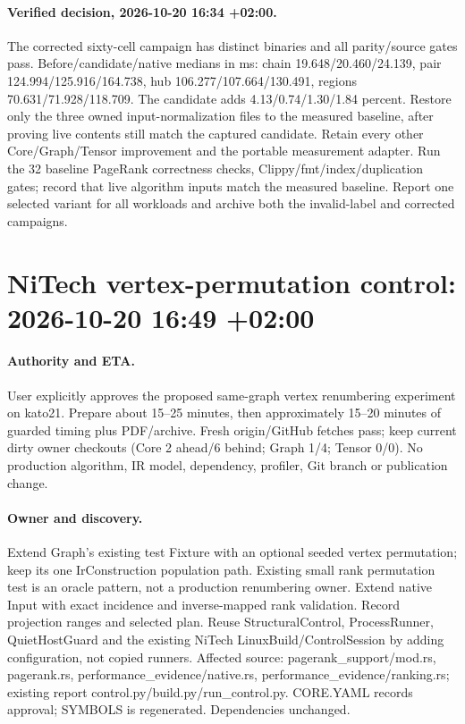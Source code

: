 \documentclass[11pt,a4paper]{article}
\begin{document}
\paragraph{Verified decision, 2026-10-20 16:34 +02:00.}
The corrected sixty-cell campaign has distinct binaries and all parity/source gates pass.
Before/candidate/native medians in ms: chain 19.648/20.460/24.139,
pair 124.994/125.916/164.738, hub 106.277/107.664/130.491,
regions 70.631/71.928/118.709. The candidate adds 4.13/0.74/1.30/1.84 percent.
Restore only the three owned input-normalization files to the measured baseline,
after proving live contents still match the captured candidate. Retain every other
Core/Graph/Tensor improvement and the portable measurement adapter. Run the 32
baseline PageRank correctness checks, Clippy/fmt/index/duplication gates; record that
live algorithm inputs match the measured baseline. Report one selected variant for
all workloads and archive both the invalid-label and corrected campaigns.
\clearpage\section*{NiTech vertex-permutation control: 2026-10-20 16:49 +02:00}
\paragraph{Authority and ETA.} User explicitly approves the proposed same-graph vertex
renumbering experiment on kato21. Prepare about 15--25 minutes, then approximately
15--20 minutes of guarded timing plus PDF/archive. Fresh origin/GitHub fetches pass;
keep current dirty owner checkouts (Core 2 ahead/6 behind; Graph 1/4; Tensor 0/0).
No production algorithm, IR model, dependency, profiler, Git branch or publication change.
\paragraph{Owner and discovery.} Extend Graph's existing test Fixture with an optional
seeded vertex permutation; keep its one IrConstruction population path. Existing small
rank permutation test is an oracle pattern, not a production renumbering owner. Extend
native Input with exact incidence and inverse-mapped rank validation. Record projection
ranges and selected plan. Reuse StructuralControl, ProcessRunner, QuietHostGuard and the
existing NiTech LinuxBuild/ControlSession by adding configuration, not copied runners.
Affected source: pagerank\_support/mod.rs, pagerank.rs, performance\_evidence/native.rs,
performance\_evidence/ranking.rs; existing report control.py/build.py/run\_control.py.
CORE.YAML records approval; SYMBOLS is regenerated. Dependencies unchanged.
\end{document}
